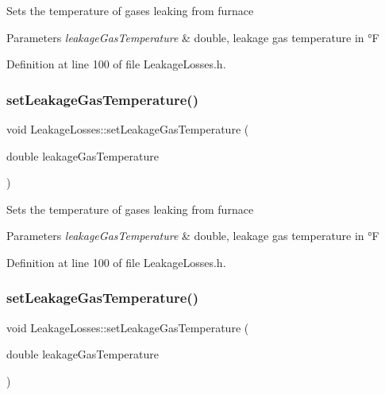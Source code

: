 Sets the temperature of gases leaking from furnace 
\begin{DoxyParams}{Parameters}
{\em leakage\+Gas\+Temperature} & double, leakage gas temperature in °F \\
\hline
\end{DoxyParams}


Definition at line 100 of file Leakage\+Losses.\+h.

\mbox{\label{class_leakage_losses_a379c88c8dea822636a1b9966e2408daa}} 
\subsubsection{\texorpdfstring{set\+Leakage\+Gas\+Temperature()}{setLeakageGasTemperature()}\hspace{0.1cm}{\footnotesize\ttfamily [2/3]}}
{\footnotesize\ttfamily void Leakage\+Losses\+::set\+Leakage\+Gas\+Temperature (\begin{DoxyParamCaption}\item[{double}]{leakage\+Gas\+Temperature }\end{DoxyParamCaption})\hspace{0.3cm}{\ttfamily [inline]}}

Sets the temperature of gases leaking from furnace 
\begin{DoxyParams}{Parameters}
{\em leakage\+Gas\+Temperature} & double, leakage gas temperature in °F \\
\hline
\end{DoxyParams}


Definition at line 100 of file Leakage\+Losses.\+h.

\mbox{\label{class_leakage_losses_a379c88c8dea822636a1b9966e2408daa}} 
\subsubsection{\texorpdfstring{set\+Leakage\+Gas\+Temperature()}{setLeakageGasTemperature()}\hspace{0.1cm}{\footnotesize\ttfamily [3/3]}}
{\footnotesize\ttfamily void Leakage\+Losses\+::set\+Leakage\+Gas\+Temperature (\begin{DoxyParamCaption}\item[{double}]{leakage\+Gas\+Temperature }\end{DoxyParamCaption})\hspace{0.3cm}{\ttfamily [inline]}}

